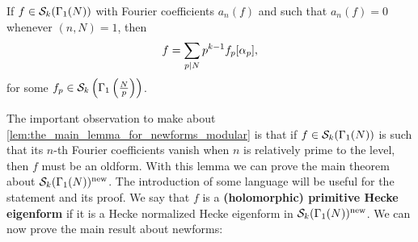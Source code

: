       \begin{lemma}\label{lem:the_main_lemma_for_newforms_modular}
        If $f \in \mathcal{S}_{k}(\Gamma_{1}(N))$ with Fourier coefficients $a_{n}(f)$ and such that $a_{n}(f) = 0$ whenever $(n,N) = 1$, then
        \[
          f = \sum_{p \mid N}p^{k-1}f_{p}[\alpha_{p}],
        \]
        for some $f_{p} \in \mathcal{S}_{k}\left(\Gamma_{1}\left(\frac{N}{p}\right)\right)$.
      \end{lemma}

      The important observation to make about \cref{lem:the_main_lemma_for_newforms_modular} is that if $f \in \mathcal{S}_{k}(\Gamma_{1}(N))$ is such that its $n$-th Fourier coefficients vanish when $n$ is relatively prime to the level, then $f$ must be an oldform. With this lemma we can prove the main theorem about $\mathcal{S}_{k}(\Gamma_{1}(N))^{\mathrm{new}}$. The introduction of some language will be useful for the statement and its proof. We say that $f$ is a \textbf{(holomorphic) primitive Hecke eigenform} if it is a Hecke normalized Hecke eigenform in $\mathcal{S}_{k}(\Gamma_{1}(N))^{\mathrm{new}}$. We can now prove the main result about newforms:

